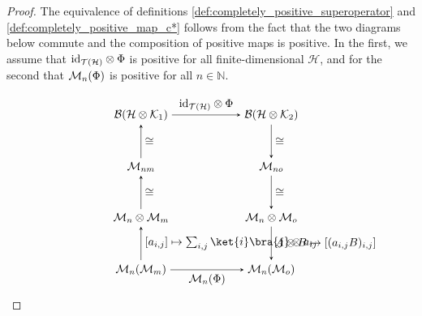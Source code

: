 \begin{proof}
The equivalence of definitions \ref{def:completely_positive_superoperator} and \ref{def:completely_positive_map_c*} follows from the fact that the two diagrams below commute and the composition of positive maps is positive. In the first, we assume that $\mathrm{id}_{\mathcal{T}(\mathcal{H})} \otimes \Phi$ is positive for all finite-dimensional $\mathcal{H}$, and for the second that $\mathcal{M}_{n}(\Phi)$ is positive for all $n \in \mathbb{N}$. 


\[
\hspace{-30pt}
\begin{minipage}{0.45\textwidth}
\centering
\begin{tikzpicture}
  \matrix (m) [matrix of math nodes,row sep=3em,column sep=6em,minimum width=1em]
  {
  \BoundOp{\HilbH \otimes \HilbK_1} & \BoundOp{\HilbH \otimes \HilbK_2} \\
  \SqMatrix{nm} & \SqMatrix{no}   \\
  \SqMatrix{n} \otimes  \SqMatrix{m} &  \SqMatrix{n} \otimes  \SqMatrix{o}  \\
  \SqMatrix{n}( \SqMatrix{m}) &  \SqMatrix{n}( \SqMatrix{o}) \\
  };
  \path[-stealth]
    (m-1-1) edge  node [above] {$\id_{\mathcal{T}(\HilbH)} \otimes \Phi  $} (m-1-2)
    (m-2-2) edge   node [right] {$\cong $} (m-3-2)
    (m-1-2) edge   node [right] {$\cong $} (m-2-2)
    (m-3-2) edge  node [right] {$ A \otimes B \mapsto [(a_{i,j} B)_{i,j}] $} (m-4-2)
    (m-3-1) edge  node [right] {$ \cong $} (m-2-1)
    (m-2-1) edge  node [right] {$ \cong $} (m-1-1)
    (m-4-1) edge  node [right] {$[a_{i,j}] \mapsto \sum_{i,j}  \ket{i}\bra{j} \otimes a_{ij} $} (m-3-1)
    (m-4-1) edge  node [below] {$\SqMatrix{n}(\Phi)$} (m-4-2)
    ;
\end{tikzpicture}
\end{minipage}
\]


\end{proof}
